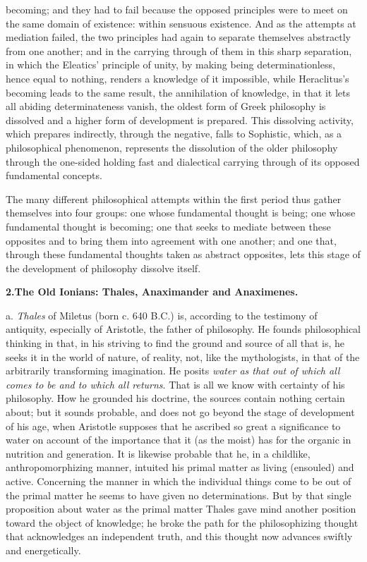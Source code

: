 becoming; and they had to fail because the opposed principles were to
meet on the same domain of existence: within sensuous existence. And
as the attempts at mediation failed, the two principles had again to
separate themselves abstractly from one another; and in the carrying
through of them in this sharp separation, in which the Eleatics'
principle of unity, by making being determinationless, hence equal to
nothing, renders a knowledge of it impossible, while Heraclitus's
becoming leads to the same result, the annihilation of knowledge, in
that it lets all abiding determinateness vanish, the oldest form of
Greek philosophy is dissolved and a higher form of development is
prepared. This dissolving activity, which prepares indirectly, through
the negative, falls to Sophistic, which, as a philosophical phenomenon,
represents the dissolution of the older philosophy through the
one-sided holding fast and dialectical carrying through of its opposed
fundamental concepts.

The many different philosophical attempts within the first period thus
gather themselves into four groups: one whose fundamental thought is
being; one whose fundamental thought is becoming; one that seeks to
mediate between these opposites and to bring them into agreement with
one another; and one that, through these fundamental thoughts taken as
abstract opposites, lets this stage of the development of philosophy
dissolve itself.

\divrule

\begin{center}
\textbf{2.\enspace The Old Ionians: Thales, Anaximander and Anaximenes.}
\end{center}

a. \emph{Thales} of Miletus (born c. 640 B.C.) is, according to the
testimony of antiquity, especially of Aristotle, the father of
philosophy. He founds philosophical thinking in that, in his striving
to find the ground and source of all that is, he seeks it in the world
of nature, of reality, not, like the mythologists, in that of the
arbitrarily transforming imagination. He posits \emph{water as that out
of which all comes to be and to which all returns}. That is
all we know with certainty of his philosophy. How he grounded his
doctrine, the sources contain nothing certain about; but it sounds
probable, and does not go beyond the stage of development of his age,
when Aristotle supposes that he ascribed so great a significance to
water on account of the importance that it (as the moist) has for the
organic in nutrition and generation. It is likewise probable that he,
in a childlike, anthropomorphizing manner, intuited his primal matter as
living (ensouled) and active. Concerning the manner in which the
individual things come to be out of the primal matter he seems to have
given no determinations. But by that single proposition about water as
the primal matter Thales gave mind another position toward the object
of knowledge; he broke the path for the philosophizing thought that
acknowledges an independent truth, and this thought now advances
swiftly and energetically.

